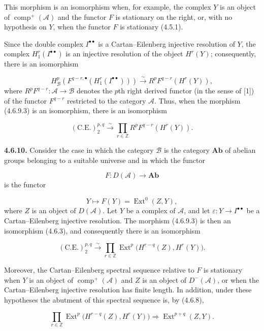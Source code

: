 \clearpage
{}%
\begingroup\small\setlength{\parskip}{0pt}\setlength{\emergencystretch}{1.5em}
\setlength{\abovedisplayskip}{4pt plus 2pt minus 2pt}%
\setlength{\belowdisplayskip}{4pt plus 2pt minus 2pt}%

\noindent This morphism is an isomorphism when, for example, the complex
$Y$ is an object of $\operatorname{comp}^{+}(\mathcal A)$ and the functor
$F$ is stationary on the right, or, with no hypothesis on $Y$, when the
functor $F$ is stationary (4.5.1).

Since the double complex $I^{\bullet\bullet}$ is a Cartan--Eilenberg
injective resolution of $Y$, the complex $H_1^r(I^{\bullet\bullet})$ is an
injective resolution of the object $H^r(Y)$; consequently, there is an
isomorphism

\[
H_{\mathcal B}^{p}\left(
F^{q-r,\bullet}(H_1^r(I^{\bullet\bullet}))
\right)
\xrightarrow{\sim}
R^pF^{q-r}(H^r(Y)),
\tag{4.6.9.4}
\]
where $R^pF^{q-r}\colon\mathcal A\longrightarrow\mathcal B$ denotes the
$p$th right derived functor (in the sense of [1]) of the functor
$F^{q-r}$ restricted to the category $\mathcal A$. Thus, when the
morphism (4.6.9.3) is an isomorphism, there is an isomorphism

\[
(\mathrm{C.E.})_2^{p,q}\xrightarrow{\sim}
\prod_{r\in\mathbb Z}R^pF^{q-r}(H^r(Y)).
\tag{4.6.9.5}
\]

\medskip\noindent\textbf{4.6.10.}\quad
Consider the case in which the category $\mathcal B$ is the category
$\mathbf{Ab}$ of abelian groups belonging to a suitable universe and in
which the functor

\[
F\colon D(\mathcal A)\longrightarrow\mathbf{Ab}
\]
is the functor

\[
Y\longmapsto F(Y)=\operatorname{Ext}^{0}(Z,Y),
\]
where $Z$ is an object of $D(\mathcal A)$. Let $Y$ be a complex of
$\mathcal A$, and let
$\varepsilon\colon Y\longrightarrow I^{\bullet\bullet}$ be a
Cartan--Eilenberg injective resolution. The morphism (4.6.9.3) is then an
isomorphism (4.6.3), and consequently there is an isomorphism

\[
(\mathrm{C.E.})_2^{p,q}\xrightarrow{\sim}
\prod_{r\in\mathbb Z}
\operatorname{Ext}^{p}\bigl(H^{r-q}(Z),H^r(Y)\bigr).
\tag{4.6.10.1}
\]

Moreover, the Cartan--Eilenberg spectral sequence relative to $F$ is
stationary when $Y$ is an object of
$\operatorname{comp}^{+}(\mathcal A)$ and $Z$ is an object of
$D^{-}(\mathcal A)$, or when the Cartan--Eilenberg injective resolution
has finite length. In addition, under these hypotheses the abutment of
this spectral sequence is, by (4.6.8),

\[
\prod_{r\in\mathbb Z}
\operatorname{Ext}^{p}\bigl(H^{r-q}(Z),H^r(Y)\bigr)
\Longrightarrow
\operatorname{Ext}^{p+q}(Z,Y).
\]
\endgroup
